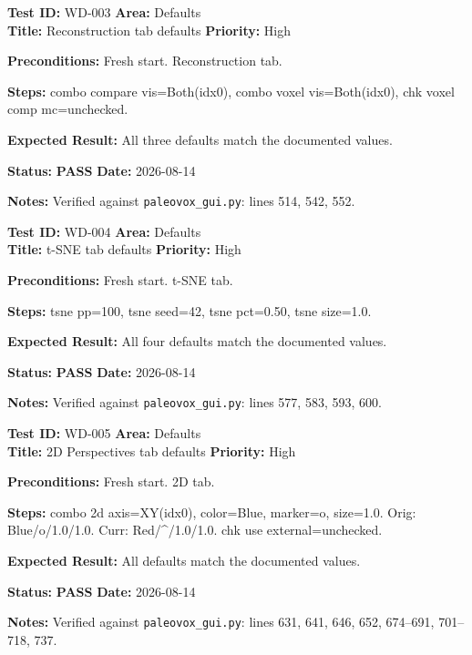 \documentclass[12pt,a4paper]{article}
\newcommand{\pass}{\textcolor{paleogreen}{\textbf{PASS}}}
\newcommand{\testheader}[4]{%
  \smallskip
  \noindent\textbf{Test ID:} #1 \hfill \textbf{Area:} #2 \\
  \textbf{Title:} #3 \hfill \textbf{Priority:} #4
}
\newenvironment{testbody}{%
  \begin{description}[leftmargin=2em,style=nextline]
}{%
  \end{description}
  \smallskip
}
\begin{document}
\testheader{WD-003}{Defaults}{Reconstruction tab defaults}{High}
\begin{testbody}
  \item[\textbf{Preconditions:}] Fresh start. Reconstruction tab.
  \item[\textbf{Steps:}] combo compare vis=Both(idx0), combo voxel vis=Both(idx0),
        chk voxel comp mc=unchecked.
  \item[\textbf{Expected Result:}] All three defaults match the documented
        values.
  \item[\textbf{Status:}] \pass{} \hspace{1em} \textbf{Date:} 2026-08-14
  \item[\textbf{Notes:}] Verified against \texttt{paleovox\_gui.py}: lines 514,
        542, 552.
\end{testbody}

\testheader{WD-004}{Defaults}{t-SNE tab defaults}{High}
\begin{testbody}
  \item[\textbf{Preconditions:}] Fresh start. t-SNE tab.
  \item[\textbf{Steps:}] tsne pp=100, tsne seed=42, tsne pct=0.50,
        tsne size=1.0.
  \item[\textbf{Expected Result:}] All four defaults match the documented
        values.
  \item[\textbf{Status:}] \pass{} \hspace{1em} \textbf{Date:} 2026-08-14
  \item[\textbf{Notes:}] Verified against \texttt{paleovox\_gui.py}: lines 577,
        583, 593, 600.
\end{testbody}

\testheader{WD-005}{Defaults}{2D Perspectives tab defaults}{High}
\begin{testbody}
  \item[\textbf{Preconditions:}] Fresh start. 2D tab.
  \item[\textbf{Steps:}] combo 2d axis=XY(idx0), color=Blue, marker=o, size=1.0.
        Orig: Blue/o/1.0/1.0. Curr: Red/\^{}/1.0/1.0.
        chk use external=unchecked.
  \item[\textbf{Expected Result:}] All defaults match the documented values.
  \item[\textbf{Status:}] \pass{} \hspace{1em} \textbf{Date:} 2026-08-14
  \item[\textbf{Notes:}] Verified against \texttt{paleovox\_gui.py}: lines 631,
        641, 646, 652, 674--691, 701--718, 737.
\end{testbody}
\end{document}
